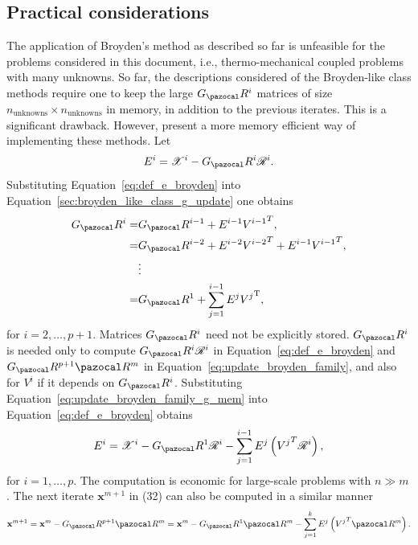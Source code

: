 \subsection{Practical considerations}

The application of Broyden's method as described so far is unfeasible for the problems considered in this document, i.e., thermo-mechanical coupled problems with many unknowns.
So far, the descriptions considered of the Broyden-like class methods require one to keep the large \(G_\pazocal R^i\) matrices of size \(n_\text{unknowns}\times n_\text{unknowns}\) in memory, in addition to the previous iterates.
This is a significant drawback.
However, \cite{fang_two_2009} present a more memory efficient way of implementing these methods.
Let
\begin{equation} \label{eq:def_e_broyden}
E^{i}=\mathscr{X}^{i}-G_\pazocal R^{i} \mathscr R^{i}.
\end{equation}
Substituting Equation~\eqref{eq:def_e_broyden} into Equation~\eqref{sec:broyden_like_class_g_update} one obtains
\begin{align}
  G_\pazocal R^{i}=& G_\pazocal R^{i-1}+E^{i-1} {V^{i-1}}^T, \\
  =& G_\pazocal R^{i-2} + E^{i-2} {V^{i-2}}^T + E^{i-1} {V^{i-1}}^T, \\
  & \vdots \\
  =& G_\pazocal R^{1}+\sum_{j=1}^{i-1} E^{j} {V^{j}}^{\mathrm{T}}, \label{eq:update_broyden_family_g_mem}
\end{align}
for \(i=2, \ldots, p+1\).
Matrices \(G_\pazocal R^{i}\) need not be explicitly stored.
\(G_\pazocal R^{i}\) is needed  only to compute \(G_\pazocal R^{i} \mathscr R^{i}\) in Equation~\eqref{eq:def_e_broyden} and \(G_\pazocal R^{p+1} \pazocal R^{m}\) in Equation~\eqref{eq:update_broyden_family}, and also for \(V^{i}\) if it depends on \(G_\pazocal R^{i}\).
Substituting Equation~\eqref{eq:update_broyden_family_g_mem} into Equation~\eqref{eq:def_e_broyden} obtains
\begin{equation} \label{eq:update_eq_for_e}
E^{i}=\mathscr{X}^{i}-G_\pazocal R^1 \mathscr{R}^{i}-\sum_{j=1}^{i-1} E^{j}\left({V^{j}}^T \mathscr{R}^{i}\right),
\end{equation}
for \(i=1, \ldots, p\).
The computation is economic for large-scale problems with \(n \gg m\).
The next iterate \(\mathbf x^{m+1}\) in (32) can also be computed in a similar manner
\begin{equation} \label{eq:mem_eff_update_broyden}
  \mathbf x^{m+1}=\mathbf x^{m} - G_\pazocal R^{p+1} \pazocal R^{m}= \mathbf x^{m} - G_\pazocal R^1 \pazocal R^{m}-\sum_{j=1}^{k} E^{j}\left({V^{j}}^T \pazocal R^m\right).
\end{equation}

